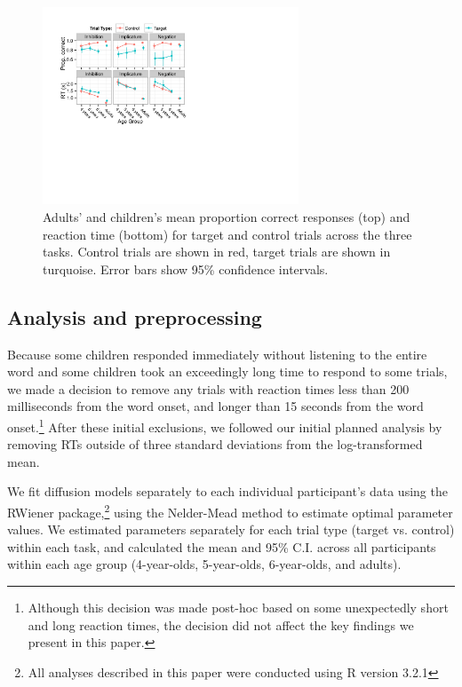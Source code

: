 \documentclass[10pt,letterpaper]{article}
\begin{document}
\begin{figure}
\begin{center}
\includegraphics[width=3in]{figures/correct_RT.pdf}
\caption{\label{fig:traditional} Adults' and children's mean proportion correct responses (top) and reaction time (bottom) for target and control trials across the three tasks. Control trials are shown in red, target trials are shown in turquoise. Error bars show 95\% confidence intervals. }
\end{center}
\end{figure}

\subsection{Analysis and preprocessing}

Because some children responded immediately without listening to the entire word and some children took an exceedingly long time to respond to some trials, we made a decision to remove any trials with reaction times less than 200 milliseconds from the word onset, and longer than 15 seconds from the word onset.\footnote{Although this decision was made post-hoc based on some unexpectedly short and long reaction times, the decision did not affect the key findings we present in this paper.} After these initial exclusions, we followed our initial planned analysis by removing RTs outside of three standard deviations from the log-transformed mean.

We fit diffusion models separately to each individual participant's data using the RWiener package,\footnote{All analyses described in this paper were conducted using R version 3.2.1} using the Nelder-Mead method to estimate optimal parameter values. We estimated parameters separately for each trial type (target vs. control) within each task, and calculated the mean and 95\% C.I. across all participants within each age group (4-year-olds, 5-year-olds, 6-year-olds, and adults).
\end{document}
